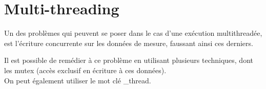 \section{Multi-threading}

Un des problèmes qui peuvent se poser dans le cas d'une exécution multithreadée, est l'écriture concurrente sur les données de mesure, faussant ainsi ces derniers. 

Il est possible de remédier à ce problème en utilisant plusieurs techniques, dont les mutex (accès exclusif en écriture à ces données).\\
On peut également utiliser le mot clé \_thread.
